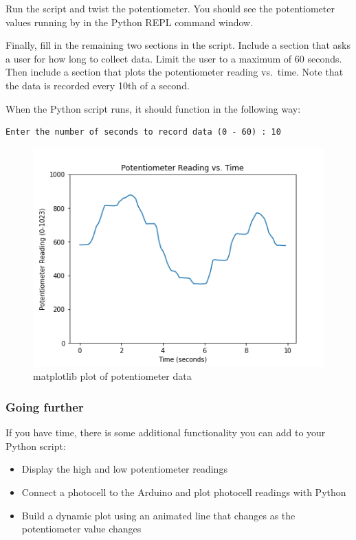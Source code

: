 \documentclass[11pt]{article}
\begin{document}
Run the script and twist the potentiometer. You should see the
potentiometer values running by in the Python REPL command window.

Finally, fill in the remaining two sections in the script. Include a
section that asks a user for how long to collect data. Limit the user to
a maximum of 60 seconds. Then include a section that plots the
potentiometer reading vs.~time. Note that the data is recorded every
10th of a second.

When the Python script runs, it should function in the following way:

\begin{verbatim}
Enter the number of seconds to record data (0 - 60) : 10
\end{verbatim}

\begin{figure}[H]
\centering
\includegraphics{images/potentiometer_reading.png}
\caption{matplotlib plot of potentiometer data}
\end{figure}

    \hypertarget{going-further}{%
\subsubsection{Going further}\label{going-further}}

If you have time, there is some additional functionality you can add to
your Python script:

\begin{itemize}
\item
  Display the high and low potentiometer readings
\item
  Connect a photocell to the Arduino and plot photocell readings with
  Python
\item
  Build a dynamic plot using an animated line that changes as the
  potentiometer value changes
\end{itemize}
\end{document}
